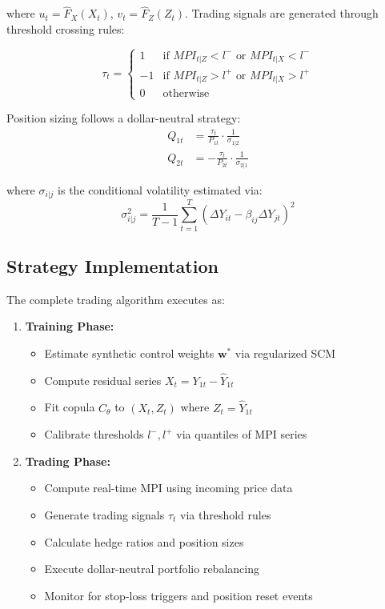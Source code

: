 where $u_t = \hat{F}_X(X_t)$, $v_t = \hat{F}_Z(Z_t)$. Trading signals are generated through threshold crossing rules:

\begin{equation}
\tau_t = 
\begin{cases}
1 & \text{if } MPI_{t|Z} < l^- \text{ or } MPI_{t|X} < l^- \\
-1 & \text{if } MPI_{t|Z} > l^+ \text{ or } MPI_{t|X} > l^+ \\
0 & \text{otherwise}
\end{cases}
\end{equation}

Position sizing follows a dollar-neutral strategy:
\begin{equation}
\begin{aligned}
Q_{1t} &= \frac{\tau_t}{P_{1t}} \cdot \frac{1}{\sigma_{1|2}} \\
Q_{2t} &= -\frac{\tau_t}{P_{2t}} \cdot \frac{1}{\sigma_{2|1}}
\end{aligned}
\end{equation}

where $\sigma_{i|j}$ is the conditional volatility estimated via:
\begin{equation}
\sigma_{i|j}^2 = \frac{1}{T-1}\sum_{t=1}^T \left(\Delta Y_{it} - \beta_{ij}\Delta Y_{jt}\right)^2
\end{equation}

\subsection{Strategy Implementation}
The complete trading algorithm executes as:

\begin{enumerate}
\item \textbf{Training Phase:}
\begin{itemize}
\item Estimate synthetic control weights $\mathbf{w}^*$ via regularized SCM
\item Compute residual series $X_t = Y_{1t} - \hat{Y}_{1t}$
\item Fit copula $C_\theta$ to $(X_t, Z_t)$ where $Z_t = \hat{Y}_{1t}$
\item Calibrate thresholds $l^-, l^+$ via quantiles of MPI series
\end{itemize}

\item \textbf{Trading Phase:}
\begin{itemize}
\item Compute real-time MPI using incoming price data
\item Generate trading signals $\tau_t$ via threshold rules
\item Calculate hedge ratios and position sizes
\item Execute dollar-neutral portfolio rebalancing
\item Monitor for stop-loss triggers and position reset events
\end{itemize}
\end{enumerate}

